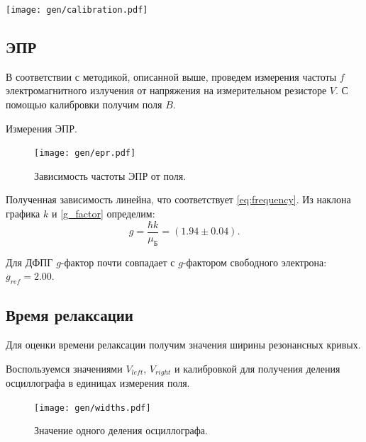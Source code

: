 \documentclass[12pt,a4paper]{article}
\begin{document}
	\begin{minipage}{\textwidth}
		\begin{minipage}[]{0.7\textwidth}
			\centering
			\texttt{[image: gen/calibration.pdf]}
		\end{minipage}
		\hfill
		\begin{minipage}[]{0.29\textwidth}
			\centering
			
		\end{minipage}
	\end{minipage}
	
	\subsection*{ЭПР}
	
	В соответствии с методикой, описанной выше, проведем измерения частоты $f$ электромагнитного излучения от напряжения на измерительном резисторе $V$. С помощью калибровки получим поля $B$. 
	
	\begin{table}[H]
		
		\caption{Измерения ЭПР.}
	\end{table}
	
	\begin{figure}[H]
		\centering
		\texttt{[image: gen/epr.pdf]}
		\caption{Зависимость частоты ЭПР от поля.}
		\label{fig:epr}
	\end{figure}
	
	Полученная зависимость линейна, что соответствует \eqref{eq:frequency}. Из наклона графика $k$ и \eqref{g_factor} определим:
	$$ g = \frac{\hbar k}{\mu_{\text{Б}}} = (1.94 \pm 0.04). $$
	
	Для ДФПГ $g$-фактор почти совпадает с $g$-фактором свободного электрона: $g_{ref} = 2.00$.
	
	\subsection*{Время релаксации}
	
	Для оценки времени релаксации получим значения ширины резонансных кривых.
	
	Воспользуемся значениями $V_{left}$, $V_{right}$ и калибровкой для получения деления осциллографа в единицах измерения поля.
	\begin{figure}[H]
		\centering
		\texttt{[image: gen/widths.pdf]}
		\caption{Значение одного деления осциллографа.}
		\label{fig:widths}
	\end{figure}
	
\end{document}
